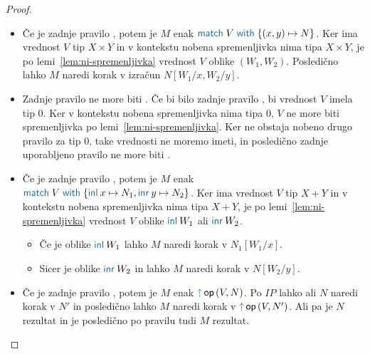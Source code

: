\begin{proof}
\begin{itemize}
		\item Če je zadnje pravilo , potem je $M$ enak $\tmmatch{V}{(x,y) \mapsto N}$.
		Ker ima vrednost $V$ tip $X \times Y$ in v kontekstu nobena spremenljivka nima tipa $X \times Y$, je po lemi~\ref{lem:ni-spremenljivka} vrednost $V$ oblike $(W_1,W_2)$.
		Posledično lahko $M$ naredi korak v izračun $N[W_1/x,W_2/y]$.
		
		\item Zadnje pravilo ne more biti .
		Če bi bilo zadnje pravilo , bi vrednost $V$ imela tip $0$. 
		Ker v kontekstu nobena spremenljivka nima tipa $0$, $V$ ne more biti spremenljivka po lemi~\ref{lem:ni-spremenljivka}.
		Ker ne obstaja nobeno drugo pravilo za tip $0$, take vrednosti ne moremo imeti, in posledično zadnje uporabljeno pravilo ne more biti .

		
		\item Če je zadnje pravilo , potem je $M$ enak $\tmmatch{V}{\tminl{x} \mapsto N_1, \tminr{y} \mapsto N_2}$.
		Ker ima vrednost $V$ tip $X + Y$ in v kontekstu nobena spremenljivka nima tipa $X + Y$, je po lemi~\ref{lem:ni-spremenljivka} vrednost $V$ oblike $\tminl{W_1}$ ali $\tminr{W_2}$.
		\begin{itemize}
			\item Če je oblike $\tminl{W_1}$ lahko $M$ naredi korak v $N_1[W_1/x]$.
			\item Sicer je oblike $\tminr{W_2}$ in lahko $M$ naredi korak v $N[W_2/y]$.
		\end{itemize}
		
		\item Če je zadnje pravilo , potem je $M$ enak $\tmopout{op}{V}{N}$.
		Po $IP$ lahko ali $N$ naredi korak v $N'$ in posledično lahko $M$ naredi korak v $\tmopout{op}{V}{N'}$.
		Ali pa je $N$ rezultat in je posledično po pravilu  tudi $M$ rezultat.
		

\end{itemize}
\end{proof}
